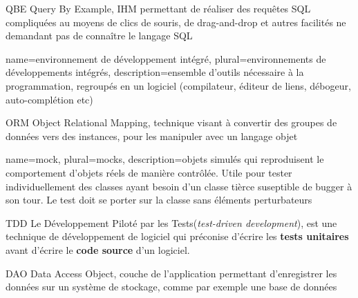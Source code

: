         {QBE}
        {Query By Example, IHM permettant de réaliser des requêtes SQL compliquées au moyens de clics de souris, de drag-and-drop et autres
        facilités ne demandant pas de connaître le langage SQL}
		
		{name={environnement de développement intégré},
		plural={environnements de développements intégrés},
		description={ensemble d'outils nécessaire à la programmation, regroupés en un logiciel (compilateur, éditeur de liens, débogeur, auto-complétion etc)}}

        {ORM}
        {Object Relational Mapping, technique visant à convertir des groupes de données vers des instances, pour les manipuler avec un langage objet}

		{
		name={mock},
		plural={mocks},
		description={objets simulés qui reproduisent le comportement d'objets réels de manière contrôlée. Utile pour tester individuellement des classes ayant besoin d'un classe tièrce suseptible de bugger à son tour.
		Le test doit se porter sur la classe sans éléments perturbateurs}
		}

	{TDD}
	{Le Développement Piloté par les Tests(\textit{test-driven development}), 
	est une technique de développement de logiciel qui préconise d'écrire les \textbf{tests unitaires} avant d'écrire le \textbf{code source} d'un logiciel.}

        {DAO}
        {Data Access Object, couche de l'application permettant d'enregistrer les données sur un système de stockage, comme par exemple une base de données}
